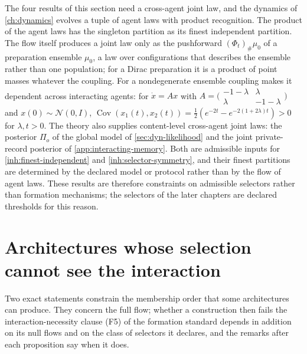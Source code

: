The four results of this section need a cross-agent joint law, and the
dynamics of \cref{ch:dynamics} evolves a tuple of agent laws with product
recognition. The product of the agent laws has the singleton partition as its
finest independent partition. The flow itself produces a joint law only as
the pushforward $(\Phi_t)_\#\mu_0$ of a preparation ensemble $\mu_0$, a law
over configurations that describes the ensemble rather than one population;
for a Dirac preparation it is a product of point masses whatever the
coupling. For a nondegenerate ensemble coupling makes it dependent across
interacting agents: for
$\dot x=Ax$ with $A=\bigl(\begin{smallmatrix}-1-\lambda&\lambda\\
\lambda&-1-\lambda\end{smallmatrix}\bigr)$ and $x(0)\sim\mathcal N(0,I)$,
$\operatorname{Cov}(x_1(t),x_2(t))=\tfrac12(e^{-2t}-e^{-2(1+2\lambda)t})>0$
for $\lambda,t>0$. The theory also supplies content-level cross-agent joint
laws: the posterior $\Pi_o$ of the global model of \cref{sec:dyn-likelihood}
and the joint private-record posterior of \cref{app:interacting-memory}.
Both are admissible inputs for \cref{inh:finest-independent} and
\cref{inh:selector-symmetry}, and their finest partitions are determined by
the declared model or protocol rather than by the flow of agent laws. These results are therefore constraints
on admissible selectors rather than formation mechanisms; the selectors of
the later chapters are declared thresholds for this reason.

\section{Architectures whose selection cannot see the interaction}

Two exact statements constrain the membership order that some architectures
can produce. They concern the full flow; whether a construction then fails
the interaction-necessity clause (F5) of the formation standard depends in
addition on its null flows and on the class of selectors it declares, and
the remarks after each proposition say when it does.

